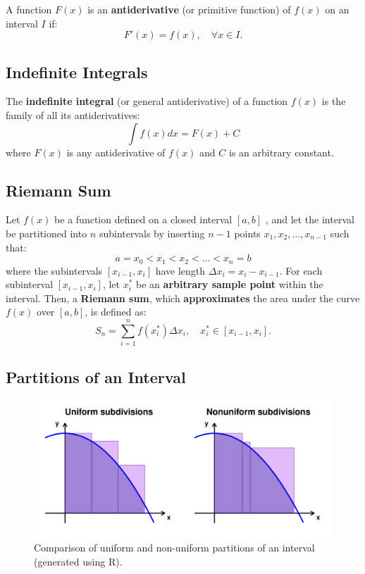 \documentclass[a4paper,11pt]{article}
\theoremstyle{definition}
\theoremstyle{plain}
\theoremstyle{remark}
\begin{document}
\begin{tcolorbox}
    A function $F(x)$ is an \textbf{antiderivative} (or primitive function) of $f(x)$ on an interval $I$ if:
    \[ F'(x) = f(x), \quad \forall x \in I. \]
\end{tcolorbox}




\subsection{Indefinite Integrals}

\begin{tcolorbox}
    The \textbf{indefinite integral} (or general antiderivative) of a function $f(x)$ is the family of all its antiderivatives:
    \[ \int f(x) dx = F(x) + C \]
    where $F(x)$ is any antiderivative of $f(x)$ and $C$ is an arbitrary constant.
\end{tcolorbox}



\subsection{Riemann Sum}

\begin{tcolorbox}
    Let $f(x)$ be a function defined on a closed interval $[a,b]$ , and let the interval be partitioned into $n$ subintervals by inserting $n-1$ points $x_1, x_2, \dots, x_{n-1}$ such that:
    \[
    a = x_0 < x_1 < x_2 < \dots < x_{n} = b
    \]
    where the subintervals $[x_{i-1}, x_i]$ have length $\Delta x_i = x_i - x_{i-1}$. For each subinterval $[x_{i-1}, x_i]$, let $x_i^*$  be an \textbf{arbitrary sample point} within the interval. Then, a \textbf{Riemann sum}, which \textbf{approximates} the area under the curve $f(x)$ over $[a,b]$, is defined as:
    \[
    S_n = \sum_{i=1}^n f(x_i^*) \Delta x_i, \quad x_i^* \in [x_{i-1}, x_i].
    \]
\end{tcolorbox}



\subsection{Partitions of an Interval}

\begin{figure}[htbp]
    \centering
    \includegraphics[width=\textwidth]{types-of-partitions.png} 
    \caption{Comparison of uniform and non-uniform partitions of an interval (generated using R).}
    \label{fig:discontinuity}
\end{figure}
\end{document}
